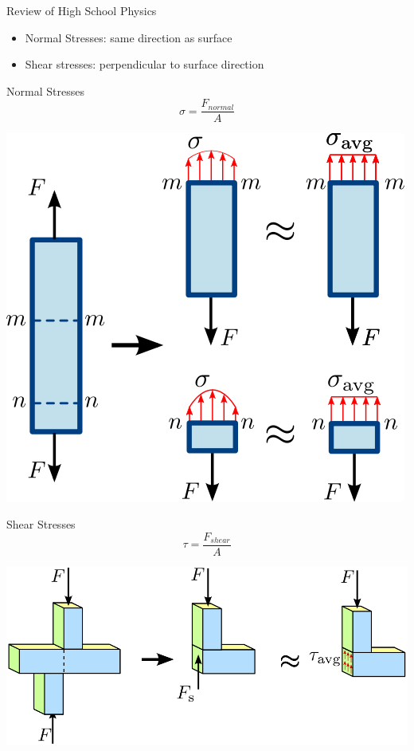 \documentclass[10pt, svgnames]{beamer}
\begin{document}
\begin{frame}[label={sec:org8a75a5b}]{Review of High School Physics}
\begin{itemize}
\item Normal Stresses: same direction as surface

\item Shear stresses: perpendicular to surface direction
\end{itemize}
\end{frame}

\begin{frame}[label={sec:org5afc55d}]{Normal Stresses}
\[\sigma = \frac{F_{normal}}{A}\]

\begin{center}
\includegraphics[height=0.7\textheight]{./pictures/normal-stress.png}
\end{center}
\end{frame}

\begin{frame}[label={sec:org29e1287}]{Shear Stresses}
\[\tau = \frac{F_{shear}}{A}\]

\includegraphics[width=\textwidth]{./pictures/shear-stress.png}
\end{frame}
\end{document}
